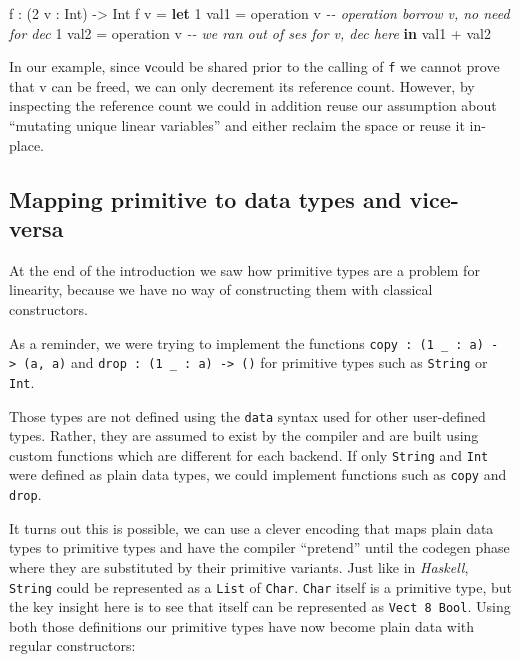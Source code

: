 \documentclass[
]{article}
\newenvironment{Shaded}{}{}
\newcommand{\CommentTok}[1]{\textcolor[rgb]{0.38,0.63,0.69}{\textit{#1}}}
\newcommand{\DataTypeTok}[1]{\textcolor[rgb]{0.56,0.13,0.00}{#1}}
\newcommand{\DecValTok}[1]{\textcolor[rgb]{0.25,0.63,0.44}{#1}}
\newcommand{\KeywordTok}[1]{\textcolor[rgb]{0.00,0.44,0.13}{\textbf{#1}}}
\newcommand{\NormalTok}[1]{#1}
\newcommand{\OperatorTok}[1]{\textcolor[rgb]{0.40,0.40,0.40}{#1}}
\newcommand{\OtherTok}[1]{\textcolor[rgb]{0.00,0.44,0.13}{#1}}
\begin{document}
\begin{Shaded}
\begin{Highlighting}[]
\NormalTok{f }\OperatorTok{:}\NormalTok{ (}\DecValTok{2}\NormalTok{ v }\OperatorTok{:} \DataTypeTok{Int}\NormalTok{) }\OtherTok{{-}\textgreater{}} \DataTypeTok{Int}
\NormalTok{f v }\OtherTok{=} \KeywordTok{let} \DecValTok{1}\NormalTok{ val1 }\OtherTok{=}\NormalTok{ operation v }\CommentTok{{-}{-} operation borrow v, no need for dec}
          \DecValTok{1}\NormalTok{ val2 }\OtherTok{=}\NormalTok{ operation v }\CommentTok{{-}{-} we ran out of ses for v, dec here}
       \KeywordTok{in}\NormalTok{ val1 }\OperatorTok{+}\NormalTok{ val2}
\end{Highlighting}
\end{Shaded}

In our example, since \texttt{v}could be shared prior to the calling of
\texttt{f} we cannot prove that v can be freed, we can only decrement
its reference count. However, by inspecting the reference count we could
in addition reuse our assumption about ``mutating unique linear
variables'' and either reclaim the space or reuse it in-place.

\hypertarget{mapping-primitive-to-data-types-and-vice-versa}{%
\subsection{Mapping primitive to data types and
vice-versa}\label{mapping-primitive-to-data-types-and-vice-versa}}

At the end of the introduction we saw how primitive types are a problem
for linearity, because we have no way of constructing them with
classical constructors.

As a reminder, we were trying to implement the functions
\texttt{copy\ :\ (1\ \_\ :\ a)\ -\textgreater{}\ (a,\ a)} and
\texttt{drop\ :\ (1\ \_\ :\ a)\ -\textgreater{}\ ()} for primitive types
such as \texttt{String} or \texttt{Int}.

Those types are not defined using the \texttt{data} syntax used for
other user-defined types. Rather, they are assumed to exist by the
compiler and are built using custom functions which are different for
each backend. If only \texttt{String} and \texttt{Int} were defined as
plain data types, we could implement functions such as \texttt{copy} and
\texttt{drop}.

It turns out this is possible, we can use a clever encoding that maps
plain data types to primitive types and have the compiler ``pretend''
until the codegen phase where they are substituted by their primitive
variants. Just like in \emph{Haskell}, \texttt{String} could be
represented as a \texttt{List} of \texttt{Char}. \texttt{Char} itself is
a primitive type, but the key insight here is to see that itself can be
represented as \texttt{Vect\ 8\ Bool}. Using both those definitions our
primitive types have now become plain data with regular constructors:
\end{document}

